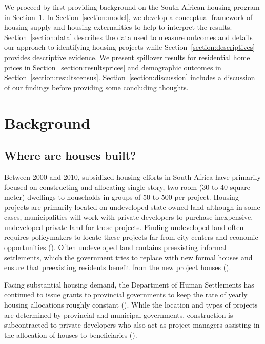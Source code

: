 \documentclass[12pt]{article}
\begin{document}
We proceed by first providing background on the South African housing program in Section~\ref{section:background}.  In Section~\ref{section:model}, we develop a conceptual framework of housing supply and housing externalities to help to interpret the results. Section~\ref{section:data} describes the data used to measure outcomes and details our approach to identifying housing projects while Section~\ref{section:descriptives} provides descriptive evidence.  We present spillover results for residential home prices in Section~\ref{section:resultsprices} and demographic outcomes in Section~\ref{section:resultscensus}.  Section~\ref{section:discussion} includes a discussion of our findings before providing some concluding thoughts.


\section{Background} \label{section:background}

\subsection{Where are houses built?}

Between 2000 and 2010, subsidized housing efforts in South Africa have primarily focused on constructing and allocating single-story, two-room (30 to 40 square meter) dwellings to households in groups of 50 to 500 per project.  Housing projects are primarily located on undeveloped state-owned land although in some cases, municipalities will work with private developers to purchase inexpensive, undeveloped private land for these projects.  Finding undeveloped land often requires policymakers to locate these projects far from city centers and economic opportunities (\cite{dhsreports}).  Often undeveloped land contains preexisting informal settlements, which the government tries to replace with new formal houses and ensure that preexisting residents benefit from the new project houses (\cite{serihistory}).

Facing substantial housing demand, the Department of Human Settlements has continued to issue grants to provincial governments to keep the rate of yearly housing allocations roughly constant (\cite{dhsreports}).  While the location and types of projects are determined by provincial and municipal governments, construction is subcontracted to private developers who also act as project managers assisting in the allocation of houses to beneficiaries (\cite{seriq}).
\end{document}

